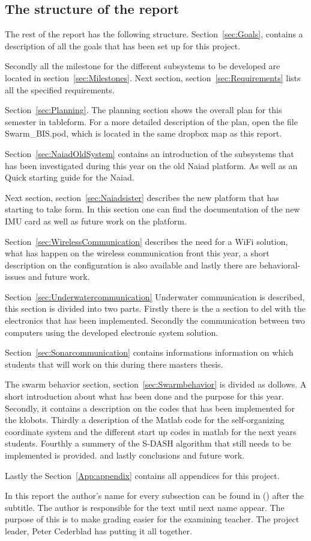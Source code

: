 \subsection{The structure of the report}
The rest of the report has the following structure.
Section~\ref{sec:Goals}, contains a description of all the goals that has been set up for this project.

Secondly all the milestone for the different subsystems to be developed are located in section~\ref{sec:Milestones}.
Next section, section~\ref{sec:Requirements} lists all the specified requirements.

Section~\ref{sec:Planning}. The planning section shows the overall plan for this semester in tableform. For a more detailed description of the plan, open the file Swarm\_BIS.pod, which is located in the same dropbox map as this report.

Section~\ref{sec:NaiadOldSystem} contains an introduction of the subsystems that has been investigated during this year on the old Naiad platform. As well as an Quick starting guide for the Naiad.

Next section, section~\ref{sec:Naiadsister} describes the new platform that has starting to take form. In this section one can find the documentation of the new IMU card as well as future work on the platform.

Section~\ref{sec:WirelessCommunication} describes the need for a WiFi solution, what has happen on the wireless communication front this year, a short description on the configuration is also available and lastly there are behavioral-issues and future work.

Section~\ref{sec:Underwatercommunication} Underwater communication is described, this section is divided into two parts. Firstly there is the a section to del with the electronics that has been implemented. Secondly the communication between two computers using the developed electronic system solution.

Section~\ref{sec:Sonarcommunication} contains informations information on which students that will work on this during there masters thesis.

The swarm behavior section, section~\ref{sec:Swarmbehavior} is divided as dollows. A short introduction about what has been done and the purpose for this year. Secondly, it contains a description on the codes that has been implemented for the klobots. Thirdly a description of the Matlab code for the self-organizing coordinate system and the different start up codes in matlab for the next years students. Fourthly a summery of the S-DASH algorithm that still needs to be implemented is provided. and lastly  conclusions and future work.

Lastly the Section~\ref{App:appendix} contains all appendices for this project.


In this report the author's name for every subsection can be found in () after the subtitle. The author is responsible for the text until next name appear. The purpose of this is to make grading easier for the examining teacher.
The project leader, Peter Cederblad has putting it all together.